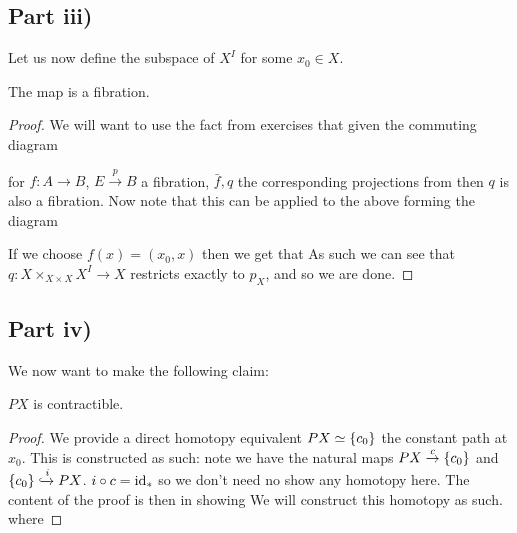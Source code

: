 \documentclass{article}
\begin{document}
\subsection{Part iii)}
Let us now define the subspace of $X^I$ 
for some $x_0 \in X$. 
\begin{prop}
The map 
is a fibration. 
\end{prop}
\begin{proof}
We will want to use the fact from exercises that given the commuting diagram \\
\begin{center}
\end{center}
for $f:A\to B$, $E\overset{p}{\to}B$ a fibration, $\bar{f},q$ the corresponding projections from 
then $q$ is also a fibration. Now note that this can be applied to the above forming the diagram \\
\begin{center}
\end{center}
If we choose $f(x) = (x_0,x)$ then we get that 
As such we can see that $q : X \times_{X\times X} X^I \to X$ restricts exactly to $p_X$, and so we are done.
\end{proof}

\subsection{Part iv)}
We now want to  make the following claim:
\begin{prop}
$PX$ is contractible.
\end{prop}
\begin{proof}
We provide a direct homotopy equivalent $PX \simeq \left\{ c_{0} \right\}$ the constant path at $x_0$. This is constructed as such: note we have the natural maps $PX \overset{c}{\to} \left\{ c_{0} \right\}$ and $\left\{ c_{0} \right\} \xhookrightarrow{i} PX$. $i \circ c = \operatorname{id}_\ast$ so we don't need no show any homotopy here. The content of the proof is then in showing 
We will construct this homotopy as such. 
where 
\end{proof}
\end{document}
